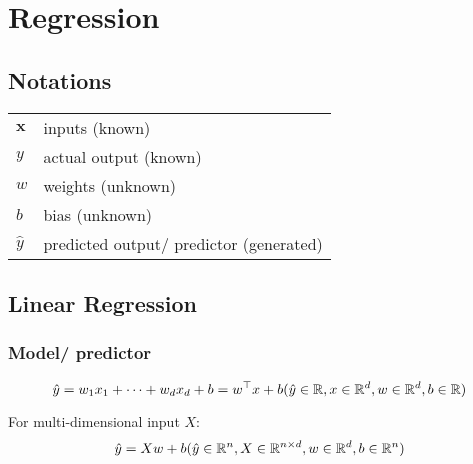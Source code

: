 \chapter{Regression}

\section*{Notations}

\begin{table}[H]
    \begin{tabular}{l l}
        $\mathbf{x}$ & inputs (known) \\
        
        $y$ & actual output (known) \\

        $w$ & weights (unknown) \\

        $b$ & bias (unknown) \\

        $\hat{y}$ & predicted output/ predictor (generated) \\

        
    \end{tabular}
\end{table}

\section{Linear Regression \cite{dnn-1}} \label{Linear Regression}

\subsection{Model/ predictor}
\[
    \hfill
    \hat{y} = w_1x_1 + \cdots + w_dx_d + b
    = w^\top x + b
    \hfill
    (
        \hat{y} \in \mathbb{R},
        x \in \mathbb{R}^d ,
        w \in \mathbb{R}^d,
        b \in \mathbb{R}
    )
\]
    

\noindent
For multi-dimensional input $X$:
\[
    \hfill
    \hat{y} = Xw + b
    \hfill
    (
        \hat{y} \in \mathbb{R}^n,
        X \in \mathbb{R}^{n\times d}, 
        w \in \mathbb{R}^d,
        b \in \mathbb{R}^n
    )
\]





























































